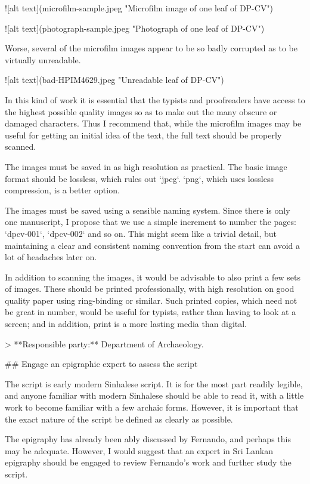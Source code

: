 \documentclass[11pt, openany,a5paper]{article}
\begin{document}
\begin{markdown}
![alt text](microfilm-sample.jpeg "Microfilm image of one leaf of DP-CV")

![alt text](photograph-sample.jpeg "Photograph of one leaf of DP-CV")

Worse, several of the microfilm images appear to be so badly corrupted as to be virtually unreadable.

![alt text](bad-HPIM4629.jpeg "Unreadable leaf of DP-CV")

In this kind of work it is essential that the typists and proofreaders have access to the highest possible quality images so as to make out the many obscure or damaged characters. Thus I recommend that, while the microfilm images may be useful for getting an initial idea of the text, the full text should be properly scanned.

The images must be saved in as high resolution as practical. The basic image format should be lossless, which rules out `jpeg`. `png`, which uses lossless compression, is a better option.

The images must be saved using a sensible naming system. Since there is only one manuscript, I propose that we use a simple increment to number the pages: `dpcv-001`, `dpcv-002` and so on. This might seem like a trivial detail, but maintaining a clear and consistent naming convention from the start can avoid a lot of headaches later on.

In addition to scanning the images, it would be advisable to also print a few sets of images. These should be printed professionally, with high resolution on good quality paper using ring-binding or similar. Such printed copies, which need not be great in number, would be useful for typists, rather than having to look at a screen; and in addition, print is a more lasting media than digital.

   > **Responsible party:** Department of Archaeology.

## Engage an epigraphic expert to assess the script

The script is early modern Sinhalese script. It is for the most part readily legible, and anyone familiar with modern Sinhalese should be able to read it, with a little work to become familiar with a few archaic forms. However, it is important that the exact nature of the script be defined as clearly as possible.

The epigraphy has already been ably discussed by Fernando, and perhaps this may be adequate. However, I would suggest that an expert in Sri Lankan epigraphy should be engaged to review Fernando’s work and further study the script.


\end{markdown}
\end{document}
